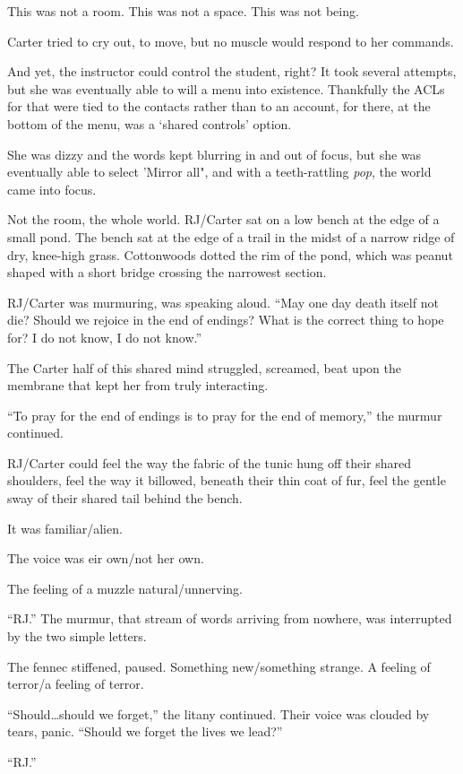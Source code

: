 This was not a room. This was not a space. This was not being.

Carter tried to cry out, to move, but no muscle would respond to her commands.

And yet, the instructor could control the student, right? It took several attempts, but she was eventually able to will a menu into existence. Thankfully the ACLs for that were tied to the contacts rather than to an account, for there, at the bottom of the menu, was a `shared controls' option.

She was dizzy and the words kept blurring in and out of focus, but she was eventually able to select 'Mirror all", and with a teeth-rattling \emph{pop}, the world came into focus.

Not the room, the whole world. RJ/Carter sat on a low bench at the edge of a small pond. The bench sat at the edge of a trail in the midst of a narrow ridge of dry, knee-high grass. Cottonwoods dotted the rim of the pond, which was peanut shaped with a short bridge crossing the narrowest section.

RJ/Carter was murmuring, was speaking aloud. ``May one day death itself not die? Should we rejoice in the end of endings? What is the correct thing to hope for? I do not know, I do not know.''

The Carter half of this shared mind struggled, screamed, beat upon the membrane that kept her from truly interacting.

``To pray for the end of endings is to pray for the end of memory,'' the murmur continued.

RJ/Carter could feel the way the fabric of the tunic hung off their shared shoulders, feel the way it billowed, beneath their thin coat of fur, feel the gentle sway of their shared tail behind the bench.

It was familiar/alien.

The voice was eir own/not her own.

The feeling of a muzzle natural/unnerving.

``RJ.'' The murmur, that stream of words arriving from nowhere, was interrupted by the two simple letters.

The fennec stiffened, paused. Something new/something strange. A feeling of terror/a feeling of terror.

``Should\ldots{}should we forget,'' the litany continued. Their voice was clouded by tears, panic. ``Should we forget the lives we lead?''

``RJ.''

